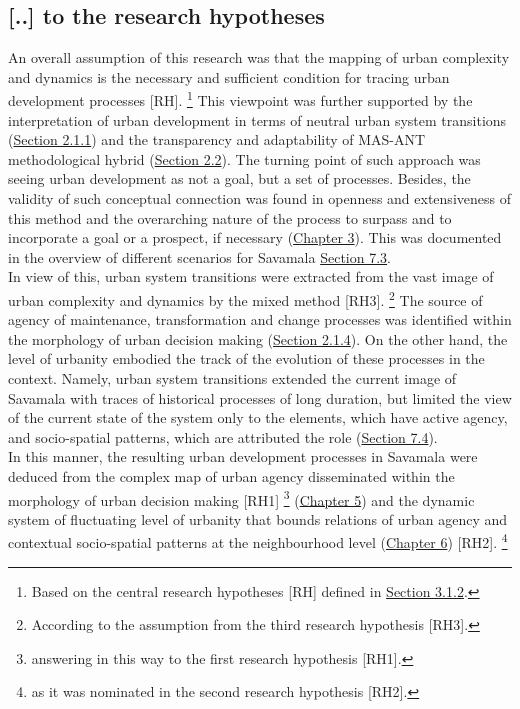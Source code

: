 \documentclass[11pt]{report}
\begin{document}
{\subsection{[..] to the research hypotheses}

An overall assumption of this research was that the mapping of urban complexity and dynamics is the necessary and sufficient condition for tracing urban development processes [RH].
\footnote{Based on the central research hypotheses [RH] defined in \href{Section 3.1.2}{Section 3.1.2}.}
This viewpoint was further supported by the interpretation of urban development in terms of neutral urban system transitions (\href{Section 2.1.1}{Section 2.1.1}) and the transparency and adaptability of MAS-ANT methodological hybrid (\href{Section 2.2}{Section 2.2}).
The turning point of such approach was seeing urban development as not a goal, but a set of processes.
Besides, the validity of such conceptual connection was found in openness and extensiveness of this method and the overarching nature of the process to surpass and to incorporate a goal or a prospect, if necessary (\href{Chapter 3}{Chapter 3}).
This was documented in the overview of different scenarios for Savamala \href{Section 7.3}{Section 7.3}.
\\

In view of this, urban system transitions were extracted from the vast image of urban complexity and dynamics by the mixed method [RH3].
\footnote{According to the assumption from the third research hypothesis [RH3].}
The source of agency of maintenance, transformation and change processes was identified within the morphology of urban decision making (\href{Section 2.1.4}{Section 2.1.4}). On the other hand, the level of urbanity embodied the track of the evolution of these processes in the context.
Namely, urban system transitions extended the current image of Savamala with traces of historical processes of long duration, but limited the view of the current state of the system only to the elements, which have active agency, and socio-spatial patterns, which are attributed the role (\href{Section 7.4}{Section 7.4}).
\\

In this manner, the resulting urban development processes in Savamala were deduced from the complex map of urban agency disseminated within the morphology of urban decision making [RH1]
\footnote{answering in this way to the first research hypothesis [RH1].}
(\href{Chapter 5}{Chapter 5})
and the dynamic system of fluctuating level of urbanity that bounds relations of urban agency and contextual socio-spatial patterns at the neighbourhood level
(\href{Chapter 6}{Chapter 6}) [RH2].
\footnote{as it was nominated in the second research hypothesis [RH2].}
\\

}
\end{document}

